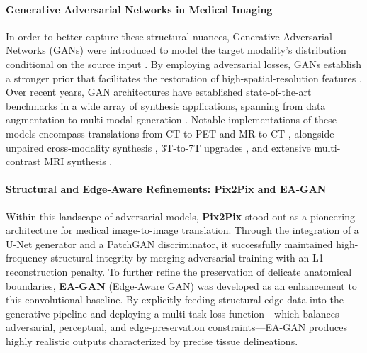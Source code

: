\documentclass[11pt,a4paper]{article}
\begin{document}
\paragraph{Generative Adversarial Networks in Medical Imaging}
In order to better capture these structural nuances, Generative Adversarial Networks (GANs) \cite{gan} were introduced to model the target modality's distribution conditional on the source input \cite{conditionalgan}. By employing adversarial losses, GANs establish a stronger prior that facilitates the restoration of high-spatial-resolution features \cite{pix2pix, cyclegan, pgan}. Over recent years, GAN architectures have established state-of-the-art benchmarks in a wide array of synthesis applications, spanning from data augmentation to multi-modal generation \cite{sandfort2019, frida2018, pgan, lee2019}. Notable implementations of these models encompass translations from CT to PET \cite{bencohen2018, santini2020} and MR to CT \cite{jin2018, ge2019, woltering2017}, alongside unpaired cross-modality synthesis \cite{dong2019, yang2018, hiasa2018, chartsias2017}, 3T-to-7T upgrades \cite{huy2021, xiang2018}, and extensive multi-contrast MRI synthesis \cite{armanious2019, beers2018, pgan, scgan, lee2019, li2019, mmgan, wang2020, yang2021, yu2018, yu2019, yurt2021mustgan, zhou2020, nie2018}.

\paragraph{Structural and Edge-Aware Refinements: Pix2Pix and EA-GAN}
Within this landscape of adversarial models, \textbf{Pix2Pix} \cite{pix2pix} stood out as a pioneering architecture for medical image-to-image translation. Through the integration of a U-Net generator and a PatchGAN discriminator, it successfully maintained high-frequency structural integrity by merging adversarial training with an L1 reconstruction penalty. To further refine the preservation of delicate anatomical boundaries, \textbf{EA-GAN} (Edge-Aware GAN) \cite{yu2019} was developed as an enhancement to this convolutional baseline. By explicitly feeding structural edge data into the generative pipeline and deploying a multi-task loss function---which balances adversarial, perceptual, and edge-preservation constraints---EA-GAN produces highly realistic outputs characterized by precise tissue delineations.
\end{document}
